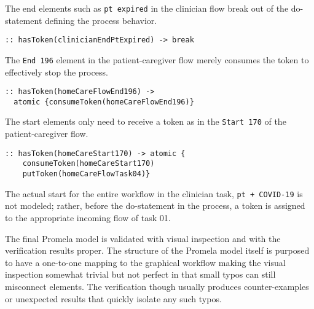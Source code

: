 The end elements such as \texttt{pt expired} in the clinician flow break out of the do-statement defining the process behavior.
%
{\small
\begin{lstlisting}[style=myPromela]
:: hasToken(clinicianEndPtExpired) -> break
\end{lstlisting}
}
%
\noindent The \texttt{End 196} element in the patient-caregiver flow merely consumes the token to effectively stop the process.
%
{\small
\begin{lstlisting}[style=myPromela]
:: hasToken(homeCareFlowEnd196) -> 
  atomic {consumeToken(homeCareFlowEnd196)}
\end{lstlisting}
}
% 
\noindent The start elements only need to receive a token as in the \texttt{Start 170} of the patient-caregiver flow.
%
{\small
\begin{lstlisting}[style=myPromela]
:: hasToken(homeCareStart170) -> atomic {
    consumeToken(homeCareStart170)
    putToken(homeCareFlowTask04)}
\end{lstlisting}
}
% 
\noindent The actual start for the entire workflow in the clinician task, \texttt{pt + COVID-19} is not modeled; rather, before the do-statement in the process, a token is assigned to the appropriate incoming flow of task 01.

The final Promela model is validated with visual inspection and with the verification results proper. The structure of the Promela model itself is purposed to have a one-to-one mapping to the graphical workflow making the visual inspection somewhat trivial but not perfect in that small typos can still misconnect elements. The verification though usually produces counter-examples or unexpected results that quickly isolate any such typos.

\begin{comment}
Creating the actual Promela model is a tedious error-prone manual process. Some effort has been invested in naming, organizing, and formatting the model to make it more amenable to visual inspection. The visual inspection is the only process by which the structure of the flow in the Promela model is verified to match the structure of the flow in the BPMN graphical model.
\end{comment}
